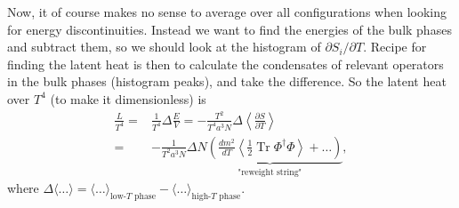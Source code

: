 \documentclass[11pt,a4paper]{article}
\newcommand\Tr{\operatorname{Tr}}
\begin{document}
Now, it of course makes no sense to average over all configurations when looking for energy discontinuities. Instead we want to find the energies of the bulk phases and subtract them, so we should look at the histogram of $\partial S_i / \partial T$. Recipe for finding the latent heat is then to calculate the condensates of relevant operators in the bulk phases (histogram peaks), and take the difference. So the latent heat over $T^4$ (to make it dimensionless) is 
\begin{align}
\frac{L}{T^4} =& \frac{1}{T^4} \Delta\frac{E}{V} = -\frac{T^2}{T^4 a^3 N} \Delta \left\langle\frac{\partial S}{\partial T}\right\rangle \nonumber \\
=& -\frac{1}{T^2 a^3 N} \Delta \underbrace{N \left( \frac{dm^2}{dT} \left\langle \frac12 \Tr\Phi^\dagger\Phi  \right\rangle + \dots \right)}_{\text{"reweight string"}},
\end{align}
where $\Delta \langle \dots \rangle = \langle \dots \rangle_\text{low-$T$ phase} - \langle \dots \rangle_\text{high-$T$ phase}$.
\end{document}
